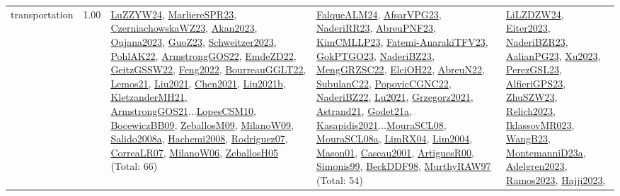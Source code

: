 {\begin{longtable}{p{3cm}r>{\raggedright\arraybackslash}p{6cm}>{\raggedright\arraybackslash}p{6cm}>{\raggedright\arraybackslash}p{8cm}}
\index{transportation}\index{Concepts!transportation}transportation &  1.00 & \hyperref[detail:LuZZYW24]{LuZZYW24}, \hyperref[detail:MarliereSPR23]{MarliereSPR23}, \hyperref[detail:CzerniachowskaWZ23]{CzerniachowskaWZ23}, \hyperref[detail:Akan2023]{Akan2023}, \hyperref[detail:Oujana2023]{Oujana2023}, \hyperref[detail:GuoZ23]{GuoZ23}, \hyperref[detail:Schweitzer2023]{Schweitzer2023}, \hyperref[detail:PohlAK22]{PohlAK22}, \hyperref[detail:ArmstrongGOS22]{ArmstrongGOS22}, \hyperref[detail:EmdeZD22]{EmdeZD22}, \hyperref[detail:GeitzGSSW22]{GeitzGSSW22}, \hyperref[detail:Feng2022]{Feng2022}, \hyperref[detail:BourreauGGLT22]{BourreauGGLT22}, \hyperref[detail:Lemos21]{Lemos21}, \hyperref[detail:Liu2021]{Liu2021}, \hyperref[detail:Chen2021]{Chen2021}, \hyperref[detail:Liu2021b]{Liu2021b}, \hyperref[detail:KletzanderMH21]{KletzanderMH21}, \hyperref[detail:ArmstrongGOS21]{ArmstrongGOS21}...\hyperref[detail:LopesCSM10]{LopesCSM10}, \hyperref[detail:BocewiczBB09]{BocewiczBB09}, \hyperref[detail:ZeballosM09]{ZeballosM09}, \hyperref[detail:MilanoW09]{MilanoW09}, \hyperref[detail:Salido2008a]{Salido2008a}, \hyperref[detail:Hachemi2008]{Hachemi2008}, \hyperref[detail:Rodriguez07]{Rodriguez07}, \hyperref[detail:CorreaLR07]{CorreaLR07}, \hyperref[detail:MilanoW06]{MilanoW06}, \hyperref[detail:ZeballosH05]{ZeballosH05} (Total: 66) & \hyperref[detail:FalqueALM24]{FalqueALM24}, \hyperref[detail:AfsarVPG23]{AfsarVPG23}, \hyperref[detail:NaderiRR23]{NaderiRR23}, \hyperref[detail:AbreuPNF23]{AbreuPNF23}, \hyperref[detail:KimCMLLP23]{KimCMLLP23}, \hyperref[detail:Fatemi-AnarakiTFV23]{Fatemi-AnarakiTFV23}, \hyperref[detail:GokPTGO23]{GokPTGO23}, \hyperref[detail:NaderiBZ23]{NaderiBZ23}, \hyperref[detail:MengGRZSC22]{MengGRZSC22}, \hyperref[detail:ElciOH22]{ElciOH22}, \hyperref[detail:AbreuN22]{AbreuN22}, \hyperref[detail:SubulanC22]{SubulanC22}, \hyperref[detail:PopovicCGNC22]{PopovicCGNC22}, \hyperref[detail:NaderiBZ22]{NaderiBZ22}, \hyperref[detail:Lu2021]{Lu2021}, \hyperref[detail:Grzegorz2021]{Grzegorz2021}, \hyperref[detail:Astrand21]{Astrand21}, \hyperref[detail:Godet21a]{Godet21a}, \hyperref[detail:Kasapidis2021]{Kasapidis2021}...\hyperref[detail:MouraSCL08]{MouraSCL08}, \hyperref[detail:MouraSCL08a]{MouraSCL08a}, \hyperref[detail:LimRX04]{LimRX04}, \hyperref[detail:Lim2004]{Lim2004}, \hyperref[detail:Mason01]{Mason01}, \hyperref[detail:Caseau2001]{Caseau2001}, \hyperref[detail:ArtiguesR00]{ArtiguesR00}, \hyperref[detail:Simonis99]{Simonis99}, \hyperref[detail:BeckDDF98]{BeckDDF98}, \hyperref[detail:MurthyRAW97]{MurthyRAW97} (Total: 54) & \hyperref[detail:LiLZDZW24]{LiLZDZW24}, \hyperref[detail:Eiter2023]{Eiter2023}, \hyperref[detail:NaderiBZR23]{NaderiBZR23}, \hyperref[detail:AalianPG23]{AalianPG23}, \hyperref[detail:Xu2023]{Xu2023}, \hyperref[detail:PerezGSL23]{PerezGSL23}, \hyperref[detail:AlfieriGPS23]{AlfieriGPS23}, \hyperref[detail:ZhuSZW23]{ZhuSZW23}, \hyperref[detail:Relich2023]{Relich2023}, \hyperref[detail:IklassovMR023]{IklassovMR023}, \hyperref[detail:WangB23]{WangB23}, \hyperref[detail:MontemanniD23a]{MontemanniD23a}, \hyperref[detail:Adelgren2023]{Adelgren2023}, \hyperref[detail:Ramos2023]{Ramos2023}, \hyperref[detail:Hajji2023]{Hajji2023}, 
\end{longtable}}
